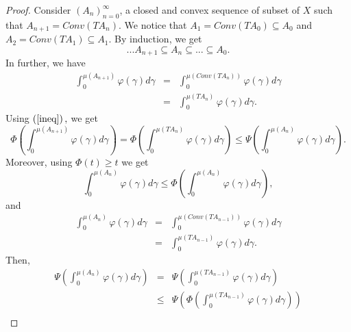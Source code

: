 \documentclass{amsart}
\theoremstyle{plain}
\numberwithin{equation}{section}
\begin{document}
\begin{proof}
Consider $\left( A_{n}\right) _{n=0}^{\infty }$, a closed and convex
sequence of subset of $X$ such that $A_{n+1}=Conv\left( TA_{n}\right) $. We
notice that $A_{1}=Conv\left( TA_{0}\right) \subseteq A_{0}$ and $A_{2}=Conv\left( TA_{1}\right) \subseteq A_{1}$. By induction, we get 
\begin{equation*}
...A_{n+1}\subseteq A_{n}\subseteq ...\subseteq A_{0}.
\end{equation*}In further, we have\begin{eqnarray*}
\int_{0}^{\mu \left( A_{n+1}\right) }\varphi \left( \gamma \right) d\gamma
&=&\int_{0}^{\mu \left( Conv\left( TA_{n}\right) \right) }\varphi \left(
\gamma \right) d\gamma \\
&=&\int_{0}^{\mu \left( TA_{n}\right) }\varphi \left( \gamma \right) d\gamma
.
\end{eqnarray*}Using $\left( \text{\ref{ineq}}\right) ,$ we get 
\begin{equation}
\Phi \left( \int_{0}^{\mu \left( A_{n+1}\right) }\varphi \left( \gamma
\right) d\gamma \right) =\Phi \left( \int_{0}^{\mu \left( TA_{n}\right)
}\varphi \left( \gamma \right) d\gamma \right) \leqslant \Psi \left(
\int_{0}^{\mu \left( A_{n}\right) }\varphi \left( \gamma \right) d\gamma
\right) .  \label{pr1}
\end{equation}Moreover, using $\Phi \left( t\right) \geqslant t$ we get 
\begin{equation*}
\int_{0}^{\mu \left( A_{n}\right) }\varphi \left( \gamma \right) d\gamma
\leqslant \Phi \left( \int_{0}^{\mu \left( A_{n}\right) }\varphi \left(
\gamma \right) d\gamma \right) ,
\end{equation*}and\begin{eqnarray*}
\int_{0}^{\mu \left( A_{n}\right) }\varphi \left( \gamma \right) d\gamma
&=&\int_{0}^{\mu \left( Conv\left( TA_{n-1}\right) \right) }\varphi \left(
\gamma \right) d\gamma \\
&=&\int_{0}^{\mu \left( TA_{n-1}\right) }\varphi \left( \gamma \right)
d\gamma .
\end{eqnarray*}Then,\begin{eqnarray*}
\Psi \left( \int_{0}^{\mu \left( A_{n}\right) }\varphi \left( \gamma \right)
d\gamma \right) &=&\Psi \left( \int_{0}^{\mu \left( TA_{n-1}\right) }\varphi
\left( \gamma \right) d\gamma \right) \\
&\leqslant &\Psi \left( \Phi \left( \int_{0}^{\mu \left( TA_{n-1}\right)
}\varphi \left( \gamma \right) d\gamma \right) \right) \\

\end{eqnarray*}
\end{proof}
\end{document}
